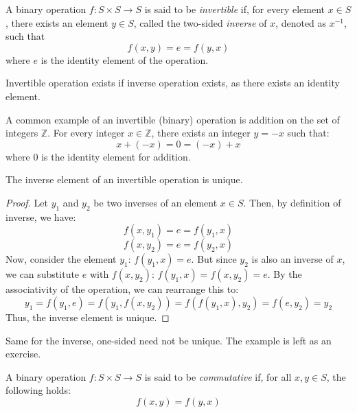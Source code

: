 \documentclass[
	11pt, %
	fleqn, %
	a4paper, %
]{LegrandOrangeBook}
\begin{document}
\begin{definition}[Invertible]
    A binary operation $f: S \times S \to S$ is said to be \emph{invertible} if, for every element $x \in S$, there exists an element $y \in S$, called the two-sided \emph{inverse} of $x$, denoted as $x^{-1}$, such that
    \[ f(x,y) = e = f(y,x) \]
    where $e$ is the identity element of the operation.
\end{definition}

\begin{remark}
    Invertible operation exists if inverse operation exists, as there exists an identity element.
\end{remark}

\begin{example}
    A common example of an invertible (binary) operation is addition on the set of integers $\mathbb{Z}$. For every integer $x \in \mathbb{Z}$, there exists an integer $y = -x$ such that:
    \begin{equation}
        x + (-x) = 0 = (-x) + x
    \end{equation}
    where $0$ is the identity element for addition.
\end{example}

\begin{proposition}
    The inverse element of an invertible operation is unique.
\end{proposition}

\begin{proof}
    Let $y_1$ and $y_2$ be two inverses of an element $x \in S$. Then, by definition of inverse, we have:
    \[ f(x,y_1) = e = f(y_1,x) \]
    \[ f(x,y_2) = e = f(y_2,x) \]
    Now, consider the element $y_1$: $f(y_1,x) = e$.
    But since $y_2$ is also an inverse of $x$, we can substitute $e$ with $f(x,y_2)$: $f(y_1,x) = f(x,y_2) = e$.
    By the associativity of the operation, we can rearrange this to:
    \[ y_1 = f(y_1, e) = f(y_1,f(x,y_2)) = f(f(y_1,x),y_2) = f(e,y_2) = y_2 \]
    Thus, the inverse element is unique.
\end{proof}

Same for the inverse, one-sided need not be unique. The example is left as an exercise.

\begin{definition}[Commutative]
    A binary operation $f: S \times S \to S$ is said to be \emph{commutative} if, for all $x,y \in S$, the following holds:
    \[ f(x,y) = f(y,x) \]
\end{definition}
\end{document}

